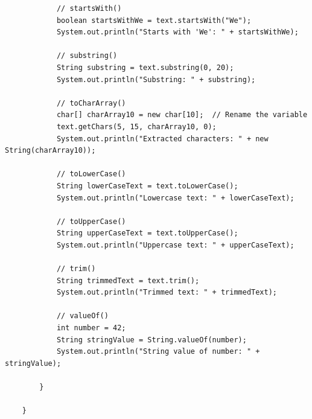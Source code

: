 \documentclass{article}
\begin{document}
\begin{lstlisting}
            // startsWith()
            boolean startsWithWe = text.startsWith("We");
            System.out.println("Starts with 'We': " + startsWithWe);
    
            // substring()
            String substring = text.substring(0, 20);
            System.out.println("Substring: " + substring);
    
            // toCharArray()
            char[] charArray10 = new char[10];  // Rename the variable
            text.getChars(5, 15, charArray10, 0);
            System.out.println("Extracted characters: " + new String(charArray10));
    
            // toLowerCase()
            String lowerCaseText = text.toLowerCase();
            System.out.println("Lowercase text: " + lowerCaseText);
    
            // toUpperCase()
            String upperCaseText = text.toUpperCase();
            System.out.println("Uppercase text: " + upperCaseText);
    
            // trim()
            String trimmedText = text.trim();
            System.out.println("Trimmed text: " + trimmedText);
    
            // valueOf()
            int number = 42;
            String stringValue = String.valueOf(number);
            System.out.println("String value of number: " + stringValue);
    
        }
    
    }
\end{lstlisting}
\end{document}
